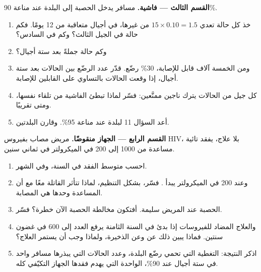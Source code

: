\begin{problem}
\medskip
\noindent\textbf{القسم الثالث --- فاشية.}
مسافر يدخل الحصبة إلى البلدة عند مناعة 90\%.
\begin{enumerate}[resume]
  \item خذ كل حالة تعدي $15 \times 0.10 = 1.5$ من غيرها، في أجيال
        متعاقبة من 12 يومًا. فكم حالة في الجيل الثالث؟ وكم في السادس؟
  \item وكم حالة جملةً بعد ستة أجيال؟
  \item ومن الخمسة آلاف قابل للإصابة، 30\% رضّع. قدّر عدد الرضّع بين
        الحالات بعد ستة أجيال، إذا وقعت الحالات بالتساوي على القابلين
        للإصابة.
  \item كل جيل من الحالات يترك ناجين ممنَّعين: فسّر لماذا تبطئ الفاشية
        من تلقاء نفسها، ومتى تقريبًا.
  \item أعد السؤال 11 لبلدة عند مناعة 95\%. وقارن البلدتين.
\end{enumerate}

\medskip
\noindent\textbf{القسم الرابع --- الجهاز منقوضًا.}
مريض مصاب بفيروس HIV، بلا علاج، يفقد  تائية مساعدة من 1000 إلى 200 في
الميكرولتر في ثماني سنين.
\begin{enumerate}[resume]
  \item احسب متوسط الفقد في السنة، وفي الشهر.
  \item وعند 200 في الميكرولتر يبدأ . فسّر، بشكل التنظيم، لماذا
        تتأثر   القاتلة معًا مع أن 
        المساعدة وحدها هي المصابة.
  \item {} الحصبة عند المريض سليمة. أفتكون مخالطة الحصبة
        الآن خطرة؟ فسّر.
  \item والعلاج المضاد للفيروسات إذا بدئ في السنة الثامنة يرفع العدد
        إلى 600 في غضون سنتين. فماذا يبين ذلك عن  وعن
        الذخيرة، ولماذا وجب أن يستمر العلاج؟
  \item اذكر النتيجة: التغطية التي تحمي رضّع البلدة، وعدد الحالات التي
        يبذرها مسافر واحد في ستة أجيال عند 90\%،  الواحدة التي
        يهدم فقدها الجهاز التكيّفي كله.
\end{enumerate}
\end{problem}
